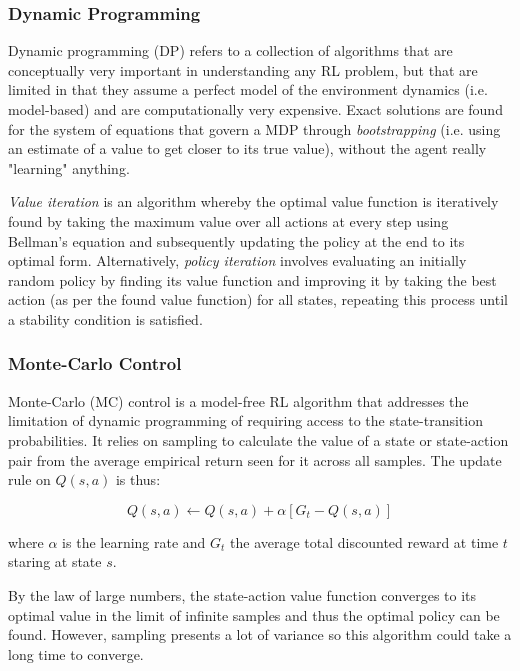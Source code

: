 \documentclass[12pt,twoside]{report}
\begin{document}
\subsubsection{Dynamic Programming}

Dynamic programming (DP) refers to a collection of algorithms that are conceptually very important in understanding any RL problem, but that are limited in that they assume a perfect model of the environment dynamics (i.e. model-based) and are computationally very expensive. Exact solutions are found for the system of equations that govern a MDP through \textit{bootstrapping} (i.e. using an estimate of a value to get closer to its true value), without the agent really "learning" anything. 

\smallskip

\textit{Value iteration} is an algorithm whereby the optimal value function is iteratively found by taking the maximum value over all actions at every step using Bellman's equation and subsequently updating the policy at the end to its optimal form. Alternatively, \textit{policy iteration} involves evaluating an initially random policy by finding its value function and improving it by taking the best action (as per the found value function) for all states, repeating this process until a stability condition is satisfied. 

\subsubsection{Monte-Carlo Control}

Monte-Carlo (MC) control \cite{Sutton1998} is a model-free RL algorithm that addresses the limitation of dynamic programming of requiring access to the state-transition probabilities. It relies on sampling to calculate the value of a state or state-action pair from the average empirical return seen for it across all samples. The update rule on $Q(s,a)$ is thus: 

\begin{equation}
    Q(s,a) \longleftarrow Q(s,a) + \alpha \left[G_t - Q(s,a)\right]
\end{equation}

\noindent where $\alpha$ is the learning rate and $G_t$ the average total discounted reward at time $t$ staring at state $s$. 

By the law of large numbers, the state-action value function converges to its optimal value in the limit of infinite samples and thus the optimal policy can be found. However, sampling presents a lot of variance so this algorithm could take a long time to converge.  
\end{document}
